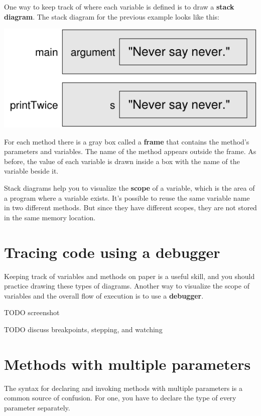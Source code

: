 One way to keep track of where each variable is defined is to draw a {\bf stack diagram}.
The stack diagram for the previous example looks like this:

\includegraphics{stack.pdf}


For each method there is a gray box called a {\bf frame} that contains the method's parameters and variables.
The name of the method appears outside the frame.
As before, the value of each variable is drawn inside a box with the name of the variable beside it.

Stack diagrams help you to visualize the {\bf scope} of a variable, which is the area of a program where a variable exists.
It's possible to reuse the same variable name in two different methods.
But since they have different scopes, they are not stored in the same memory location.


\section{Tracing code using a debugger}


Keeping track of variables and methods on paper is a useful skill, and you should practice drawing these types of diagrams.
Another way to visualize the scope of variables and the overall flow of execution is to use a {\bf debugger}.

TODO screenshot

TODO discuss breakpoints, stepping, and watching


\section{Methods with multiple parameters}
\label{time}


The syntax for declaring and invoking methods with multiple parameters is a common source of confusion.
For one, you have to declare the type of every parameter separately.

